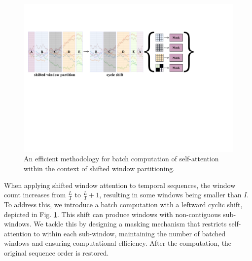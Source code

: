 \documentclass[letterpaper]{article} %
\begin{document}
\begin{figure}[h]
\renewcommand{\baselinestretch}{1.0}
\centering
\includegraphics[width=0.92\columnwidth]{shift.pdf}
\caption{An efficient methodology for batch computation of self-attention within the context of shifted window partitioning.}\label{fig4}
\end{figure}
When applying shifted window attention to temporal sequences, the window count increases from $\frac{L}{I}$ to $\frac{L}{I} + 1$, resulting in some windows being smaller than $I$. To address this, we introduce a batch computation with a leftward cyclic shift, depicted in Fig. \ref{fig4}. This shift can produce windows with non-contiguous sub-windows. We tackle this by designing a masking mechanism that restricts self-attention to within each sub-window, maintaining the number of batched windows and ensuring computational efficiency. After the computation, the original sequence order is restored.
\end{document}
